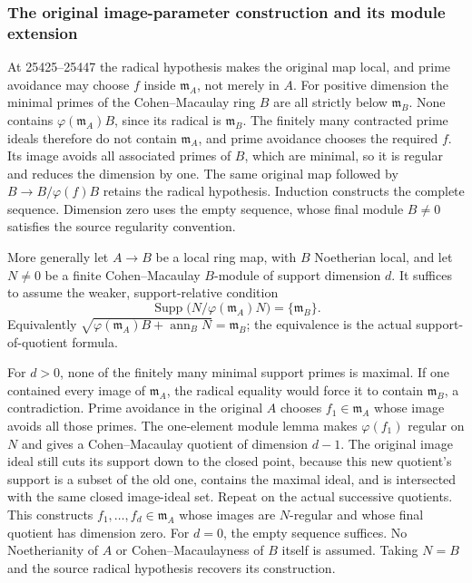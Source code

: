 \subsubsection{The original image-parameter construction and its module extension}\label{the-original-image-parameter-construction-and-its-module-extension}

At 25425--25447 the radical hypothesis makes the original map local, and prime avoidance may choose \(f\) inside \(\mathfrak m_A\), not merely in \(A\). For positive dimension the minimal primes of the Cohen--Macaulay ring \(B\) are all strictly below \(\mathfrak m_B\). None contains \(\varphi(\mathfrak m_A)B\), since its radical is \(\mathfrak m_B\). The finitely many contracted prime ideals therefore do not contain \(\mathfrak m_A\), and prime avoidance chooses the required \(f\). Its image avoids all associated primes of \(B\), which are minimal, so it is regular and reduces the dimension by one. The same original map followed by \(B\to B/\varphi(f)B\) retains the radical hypothesis. Induction constructs the complete sequence. Dimension zero uses the empty sequence, whose final module \(B\ne0\) satisfies the source regularity convention.

More generally let \(A\to B\) be a local ring map, with \(B\) Noetherian local, and let \(N\ne0\) be a finite Cohen--Macaulay \(B\)-module of support dimension \(d\). It suffices to assume the weaker, support-relative condition \[
 \operatorname{Supp}\bigl(N/\varphi(\mathfrak m_A)N\bigr)
       =\{\mathfrak m_B\}.
\] Equivalently \(\sqrt{\varphi(\mathfrak m_A)B+\operatorname{ann}_B N}=\mathfrak m_B\); the equivalence is the actual support-of-quotient formula.

For \(d>0\), none of the finitely many minimal support primes is maximal. If one contained every image of \(\mathfrak m_A\), the radical equality would force it to contain \(\mathfrak m_B\), a contradiction. Prime avoidance in the original \(A\) chooses \(f_1\in\mathfrak m_A\) whose image avoids all those primes. The one-element module lemma makes \(\varphi(f_1)\) regular on \(N\) and gives a Cohen--Macaulay quotient of dimension \(d-1\). The original image ideal still cuts its support down to the closed point, because this new quotient's support is a subset of the old one, contains the maximal ideal, and is intersected with the same closed image-ideal set. Repeat on the actual successive quotients. This constructs \(f_1,\ldots,f_d\in\mathfrak m_A\) whose images are \(N\)-regular and whose final quotient has dimension zero. For \(d=0\), the empty sequence suffices. No Noetherianity of \(A\) or Cohen--Macaulayness of \(B\) itself is assumed. Taking \(N=B\) and the source radical hypothesis recovers its construction.

